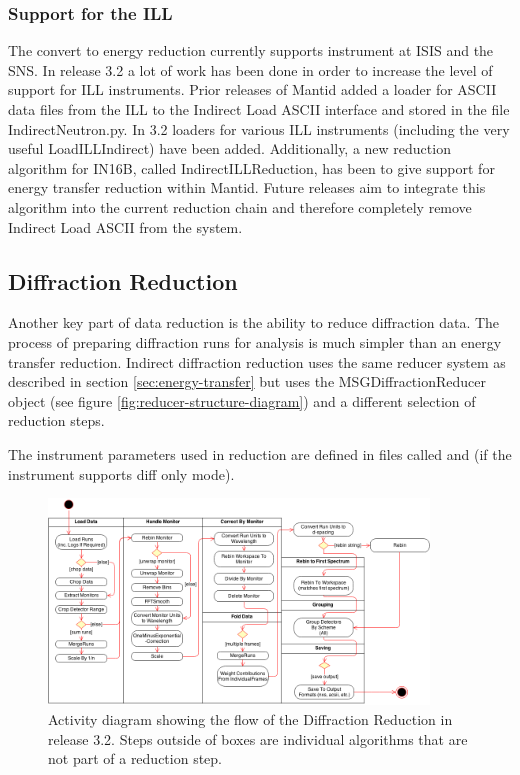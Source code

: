 \documentclass[paper=a4, fontsize=11pt]{scrartcl}	%
\numberwithin{equation}{section}															%
\numberwithin{figure}{section}																%
\numberwithin{table}{section}																%
\begin{document}
\subsubsection{Support for the ILL}
The convert to energy reduction currently supports instrument at ISIS and the SNS. In release 3.2 a lot of work has been done in order to increase the level of support for ILL instruments. Prior releases of Mantid added a loader for ASCII data files from the ILL to the Indirect Load ASCII interface and stored in the file IndirectNeutron.py. In 3.2 loaders for various ILL instruments (including the very useful LoadILLIndirect) have been added. Additionally, a new reduction algorithm for IN16B, called IndirectILLReduction, has been to give support for energy transfer reduction within Mantid. Future releases aim to integrate this algorithm into the current reduction chain and therefore completely remove Indirect Load ASCII from the system.

\subsection{Diffraction Reduction}
\label{subsec:indirect-diffraction}
Another key part of data reduction is the ability to reduce diffraction data. The process of preparing diffraction runs for analysis is much simpler than an energy transfer reduction. Indirect diffraction reduction uses the same reducer system as described in section \ref{sec:energy-transfer} but uses the MSGDiffractionReducer object (see figure \ref{fig:reducer-structure-diagram}) and a different selection of reduction steps. 

The instrument parameters used in reduction are defined in files called  and  (if the instrument supports diff only mode).

\begin{figure}[H]
\centering
\includegraphics[width=0.9\textwidth]{img/uml/activity_diagrams/DiffractionReduction_activity.png}
\caption{Activity diagram showing the flow of the Diffraction Reduction in release 3.2. Steps outside of boxes are individual algorithms that are not part of a reduction step.}
\label{fig:diffraction-class-diagram}
\end{figure}
\end{document}
